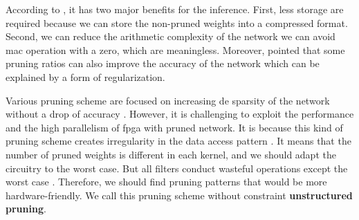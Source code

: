 According to \textcite{cheng_recent_2018}, it has two major benefits for the inference. First, less storage are required because we can store the non-pruned weights into a compressed format. Second, we can reduce the arithmetic complexity of the network we can avoid \acrshort{mac} operation with a zero, which are meaningless. Moreover, \textcite{han_learning_2015, mao_exploring_2017, kang_accelerator-aware_2020} pointed that some pruning ratios can also improve the accuracy of the network which can be explained by a form of regularization.

Various pruning scheme are focused on increasing de sparsity of the network without a drop of accuracy \cite{han_learning_2015, han_deep_2016}. However, it is challenging to exploit the performance and the high parallelism of \acrshort{fpga} with pruned network. It is because this kind of pruning scheme creates irregularity in the data access pattern \cite{zhu_efficient_2020}. It means that the number of pruned weights is different in each kernel, and we should adapt the circuitry to the worst case. But all filters conduct wasteful operations except the worst case \cite{shimoda_filter-wise_2019}. Therefore, we should find pruning patterns that would be more hardware-friendly. We call this pruning scheme without constraint \textbf{unstructured pruning}. 

